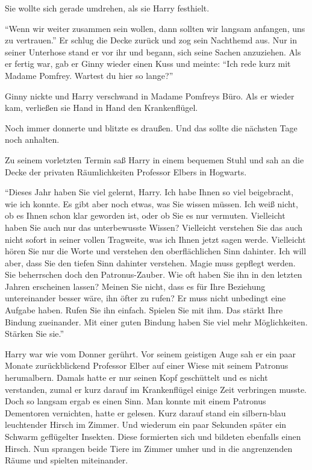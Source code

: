 Sie wollte sich gerade umdrehen, als sie Harry festhielt.

\enquote{Wenn wir weiter zusammen sein wollen, dann sollten wir langsam anfangen, uns zu vertrauen.} Er schlug die Decke zurück und zog sein Nachthemd aus. Nur in seiner Unterhose stand er vor ihr und begann, sich seine Sachen anzuziehen. Als er fertig war, gab er Ginny wieder einen Kuss und meinte: \enquote{Ich rede kurz mit Madame Pomfrey. Wartest du hier so lange?}

Ginny nickte und Harry verschwand in Madame Pomfreys Büro. Als er wieder kam, verließen sie Hand in Hand den Krankenflügel.

Noch immer donnerte und blitzte es draußen. Und das sollte die nächsten Tage noch anhalten.

\trenn

Zu seinem vorletzten Termin saß Harry in einem bequemen Stuhl und sah an die Decke der privaten Räumlichkeiten Professor Elbers in Hogwarts.

\enquote{Dieses Jahr haben Sie viel gelernt, Harry. Ich habe Ihnen so viel beigebracht, wie ich konnte. Es gibt aber noch etwas, was Sie wissen müssen. \gst Ich weiß nicht, ob es Ihnen schon klar geworden ist, oder ob Sie es nur vermuten. Vielleicht haben Sie auch nur das unterbewusste Wissen? \gst Vielleicht verstehen Sie das auch nicht sofort in seiner vollen Tragweite, was ich Ihnen jetzt sagen werde. Vielleicht hören Sie nur die Worte und verstehen den oberflächlichen Sinn dahinter. Ich will aber, dass Sie den tiefen Sinn dahinter verstehen. \gst Magie muss gepflegt werden. \gst Sie beherrschen doch den Patronus-Zauber. \gst Wie oft haben Sie ihn in den letzten Jahren erscheinen lassen? \gst Meinen Sie nicht, dass es für Ihre Beziehung untereinander besser wäre, ihn öfter zu rufen? Er muss nicht unbedingt eine Aufgabe haben. Rufen Sie ihn einfach. Spielen Sie mit ihm. \gst Das stärkt Ihre Bindung zueinander. Mit einer guten Bindung haben Sie viel mehr Möglichkeiten. \gst Stärken Sie sie.}

Harry war wie vom Donner gerührt. Vor seinem geistigen Auge sah er ein paar Monate zurückblickend Professor Elber auf einer Wiese mit seinem Patronus herumalbern. Damals hatte er nur seinen Kopf geschüttelt und es nicht verstanden, zumal er kurz darauf im Krankenflügel einige Zeit verbringen musste. Doch so langsam ergab es einen Sinn. Man konnte mit einem Patronus Dementoren vernichten, hatte er gelesen.  Kurz darauf stand ein silbern-blau leuchtender Hirsch im Zimmer. Und wiederum ein paar Sekunden später ein Schwarm geflügelter Insekten. Diese formierten sich und bildeten ebenfalls einen Hirsch. Nun sprangen beide Tiere im Zimmer umher und in die angrenzenden Räume und spielten miteinander.

